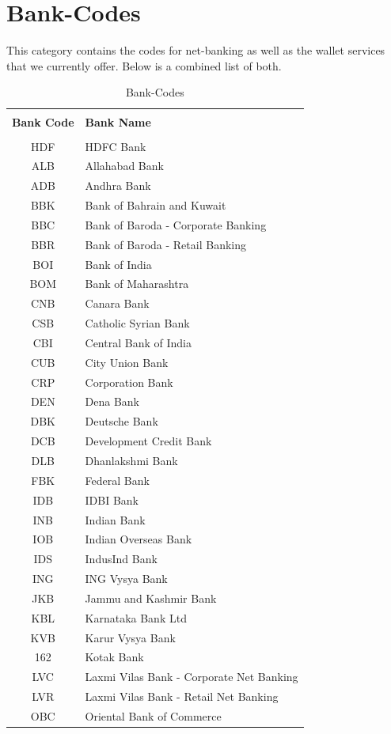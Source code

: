 \documentclass{article}
\begin{document}
\section{Bank-Codes}This category contains 
the codes for net-banking as well as the wallet services that we currently offer. Below is a combined list of both.
\begin{longtable}{||c|p{12.5cm}||}
\rowcolor{white}
\caption{Bank-Codes}\\
   \rowcolor{green!50}
\bfseries{Bank Code} & \bfseries{Bank Name} \\ \hline  & \\
HDF & HDFC Bank\\
ALB & Allahabad Bank\\
ADB & Andhra Bank\\
BBK & Bank of Bahrain and Kuwait\\
BBC & Bank of Baroda - Corporate Banking\\
BBR & Bank of Baroda - Retail Banking\\
BOI & Bank of India\\
BOM & Bank of Maharashtra\\
CNB & Canara Bank\\
CSB & Catholic Syrian Bank\\
CBI & Central Bank of India\\
CUB & City Union Bank\\
CRP & Corporation Bank\\
DEN & Dena Bank\\
DBK & Deutsche Bank\\
DCB & Development Credit Bank\\
DLB & Dhanlakshmi Bank\\
FBK & Federal Bank\\
IDB & IDBI Bank\\
INB & Indian Bank\\
IOB & Indian Overseas Bank\\
IDS & IndusInd Bank\\
ING & ING Vysya Bank\\
JKB & Jammu and Kashmir Bank\\
KBL & Karnataka Bank Ltd\\
KVB & Karur Vysya Bank\\
162 & Kotak Bank\\
LVC & Laxmi Vilas Bank - Corporate Net Banking\\
LVR & Laxmi Vilas Bank - Retail Net Banking\\
OBC & Oriental Bank of Commerce\\

\end{longtable}
\end{document}
